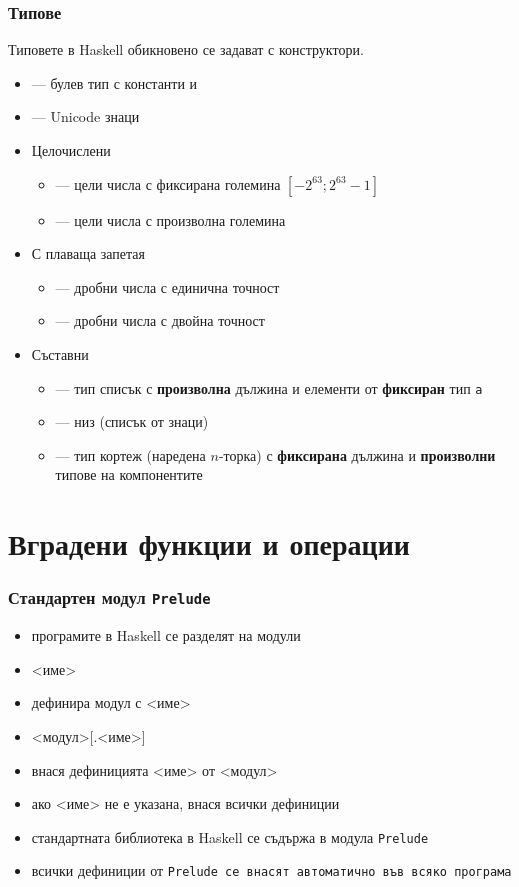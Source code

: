 \documentclass{beamer}
\begin{document}
\begin{frame}
  \frametitle{Типове}

  Типовете в Haskell обикновено се задават с конструктори. \pause
  \begin{itemize}[<+->]
  \item {} --- булев тип с константи  и 
  \item {} --- Unicode знаци
  \item Целочислени
    \begin{itemize}
    \item {} --- цели числа с фиксирана големина $[-2^{63}; 2^{63}-1]$
    \item {} --- цели числа с произволна големина
    \end{itemize}
  \item С плаваща запетая
    \begin{itemize}
    \item {} --- дробни числа с единична точност
    \item {} --- дробни числа с двойна точност
    \end{itemize}
  \item Съставни
    \begin{itemize}
    \item \lst{[a]} --- тип списък с \textbf{произволна} дължина и
      елементи от \textbf{фиксиран} тип \tt a
    \item {} --- низ (списък от знаци)
    \item {} --- тип кортеж (наредена $n$-торка) с
      \textbf{фиксирана} дължина и \textbf{произволни} типове на
      компонентите
    \end{itemize}
  \end{itemize}
\end{frame}

\section{Вградени функции и операции}

\begin{frame}
  \frametitle{Стандартен модул \tt{Prelude}}

  \begin{itemize}[<+->]
  \item програмите в Haskell се разделят на модули
  \item {} <име> 
  \item дефинира модул с <име>
  \item {} <модул>[\tta.<име>]
  \item внася дефиницията <име> от <модул>
  \item ако <име> не е указана, внася всички дефиниции
  \item стандартната библиотека в Haskell се съдържа в модула \tt{Prelude}
  \item всички дефиниции от \tt{Prelude} се внасят автоматично във всяко програма
  \end{itemize}
\end{frame}
\end{document}
